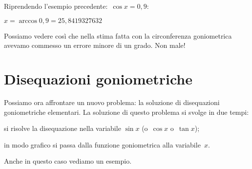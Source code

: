 
\begin{esempio}
 Riprendendo l'esempio precedente:~\(\cos x = 0,9\):
 
 \(x = \arccos 0,9 = 25,8419327632\) 
 
 Possiamo vedere così che nella stima fatta con la circonferenza goniometrica 
 avevamo commesso un errore minore di un grado. Non male!
\end{esempio}


\section{Disequazioni goniometriche}
\label{sec:gonio_disequazionigonio}

Possiamo ora affrontare un nuovo problema: la soluzione di disequazioni 
goniometriche elementari. La soluzione di questo problema si svolge in due 
tempi:
\begin{enumerate*}
 \item si risolve la disequazione nella variabile \(\sin x\) 
  (o~\(\cos x\) o~\(\tan x\));
 \item in modo grafico si passa dalla funzione goniometrica alla 
variabile~\(x\).
\end{enumerate*}

Anche in questo caso vediamo un esempio.

